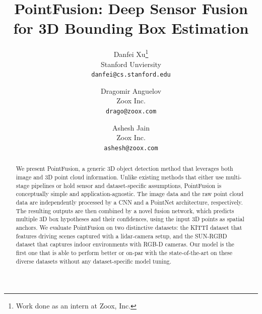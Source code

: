 \documentclass[10pt,twocolumn,letterpaper]{article}
\begin{document}
\title{PointFusion: Deep Sensor Fusion for 3D Bounding Box Estimation}

\author{Danfei Xu\thanks{Work done as an intern at Zoox, Inc.}\\
Stanford Unviersity\\
{\tt\small danfei@cs.stanford.edu}
\and
Dragomir Anguelov \\
Zoox Inc.\\
{\tt\small drago@zoox.com}
\and
Ashesh Jain \\
Zoox Inc.\\
{\tt\small ashesh@zoox.com}
}

\maketitle
\newcommand{\vparagraph}[1]{\vspace{-12pt}\paragraph{#1}}


\begin{abstract}
We present PointFusion, a generic 3D object detection method that leverages both image and 3D point cloud information. Unlike existing methods that either use multi-stage pipelines or hold sensor and dataset-specific assumptions, PointFusion is conceptually simple and application-agnostic. The image data and the raw point cloud data are independently processed by a CNN and a PointNet architecture, respectively. The resulting outputs are then combined by a novel fusion network, which predicts multiple 3D box hypotheses and their confidences, using the input 3D points as spatial anchors.  We evaluate PointFusion on two distinctive datasets: the KITTI dataset that features driving scenes captured with a lidar-camera setup, and the SUN-RGBD dataset that captures indoor environments with RGB-D cameras. 
Our model is the first one that is able to perform better or on-par with the state-of-the-art on these diverse datasets without any dataset-specific model tuning.
\end{abstract}

\vspace{-15pt}
\end{document}
